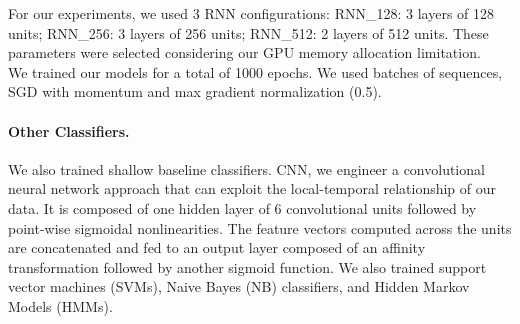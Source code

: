 \documentclass{llncs}
\begin{document}
For  our experiments, we used 3 RNN configurations: RNN\_128: 3 layers of 128 units;  RNN\_256: 3 layers of 256 units; RNN\_512: 2 layers of 512  units. These parameters were selected considering our GPU memory allocation limitation.\\
We trained our models for a total of 1000 epochs. We used batches of sequences, SGD with momentum and max gradient normalization (0.5).

\vspace*{-\baselineskip}
\paragraph{Other Classifiers.} We also trained shallow baseline classifiers. {CNN,} we engineer a convolutional neural network approach that can exploit the local-temporal relationship of our data.  It is composed of one hidden layer of 6 convolutional units followed by point-wise sigmoidal nonlinearities. The feature vectors computed across the units are concatenated and fed to an output layer composed of an affinity transformation followed by another sigmoid function. We also trained support vector machines ({SVMs}), Naive Bayes ({NB}) classifiers, and Hidden Markov Models ({HMMs}). %
\vspace*{-\baselineskip}
\end{document}
